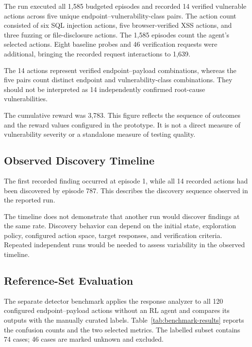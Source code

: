 \documentclass[conference]{IEEEtran}
\begin{document}
The run executed all 1,585 budgeted episodes and recorded 14
verified vulnerable actions across five unique
endpoint--vulnerability-class pairs. The action count
consisted of six SQL injection actions, five browser-verified
XSS actions, and three fuzzing or file-disclosure actions.
The 1,585 episodes count the agent's selected actions. Eight
baseline probes and 46 verification requests were additional,
bringing the recorded request interactions to 1,639.

The 14 actions represent verified endpoint--payload
combinations, whereas the five pairs count distinct
endpoint and vulnerability-class combinations. They should
not be interpreted as 14 independently confirmed root-cause
vulnerabilities.

The cumulative reward was 3,783. This figure reflects
the sequence of outcomes and the reward values configured
in the prototype. It is not a direct measure of
vulnerability severity or a standalone measure of testing
quality.

\subsection{Observed Discovery Timeline}

The first recorded finding occurred at episode 1, while
all 14 recorded actions had been discovered by episode
787. This describes the discovery sequence observed in
the reported run.

The timeline does not demonstrate that another run
would discover findings at the same rate. Discovery
behavior can depend on the initial state, exploration
policy, configured action space, target responses, and
verification criteria. Repeated independent runs would
be needed to assess variability in the observed timeline.

\subsection{Reference-Set Evaluation}

The separate detector benchmark applies the response
analyzer to all 120 configured endpoint--payload actions
without an RL agent and compares its outputs with the
manually curated labels. Table~\ref{tab:benchmark-results}
reports the confusion counts and the two selected metrics.
The labelled subset contains 74 cases; 46 cases are marked
unknown and excluded.
\end{document}
